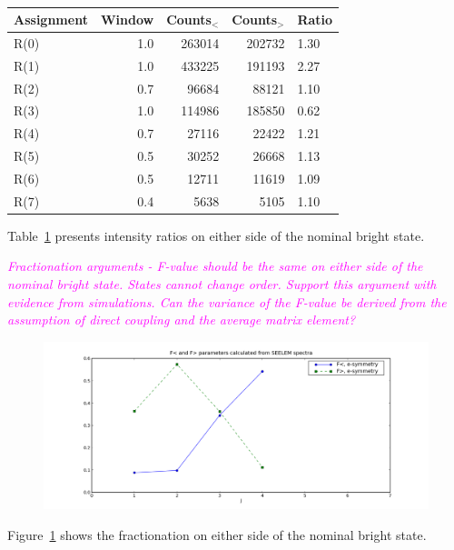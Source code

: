 \documentclass[12pt]{mitthesis}
\newcommand{\POINT}[1]{\textcolor{magenta}{\emph{#1}}}
\begin{document}
\begin{table}
  \centering
  \caption{}
  \label{table:seelem-intensity-ratios}
  \begin{tabular}[t]{l r r r l}
    \toprule
    Assignment & Window & Counts$_<$ & Counts$_>$ & Ratio \\
    \midrule
    R(0) & 1.0 & 263014 & 202732 & 1.30 \\
    R(1) & 1.0 & 433225	& 191193 & 2.27 \\
    R(2) & 0.7 &  96684 &  88121 & 1.10 \\
    R(3) & 1.0 & 114986 & 185850 & 0.62 \\
    R(4) & 0.7 &  27116 &  22422 & 1.21 \\
    R(5) & 0.5 &  30252 &  26668 & 1.13 \\
    R(6) & 0.5 &  12711 &  11619 & 1.09 \\
    R(7) & 0.4 &   5638 &   5105 & 1.10 \\
    \bottomrule
  \end{tabular}
\end{table}

Table~\ref{table:seelem-intensity-ratios} presents intensity ratios on
either side of the nominal bright state.

\POINT{Fractionation arguments - F-value should be the same on either
  side of the nominal bright state. States cannot change
  order. Support this argument with evidence from simulations. Can the
  variance of the F-value be derived from the assumption of direct
  coupling and the average matrix element?}

\begin{figure}
  \caption{}
  \label{fig:f-seelem}
  \centering
  \includegraphics[width=7in]{f-seelem.png}
\end{figure}

Figure~\ref{fig:f-seelem} shows the fractionation on either side of
the nominal bright state.
\end{document}
